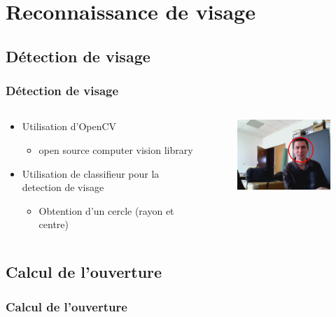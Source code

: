 \section{Reconnaissance de visage}
\subsection{Détection de visage}
\begin{frame}
  \frametitle{Détection de visage}
  \begin{columns}[c]
    \begin{column}[T]{.5\textwidth}
      \begin{itemize}
        \item Utilisation d'OpenCV
          \begin{itemize}
            \item open source computer vision library
          \end{itemize}
        \item Utilisation de classifieur pour la detection de visage
          \begin{itemize}
            \item Obtention d'un cercle (rayon et centre)
          \end{itemize}
      \end{itemize}
    \end{column}
    \begin{column}[T]{.5\textwidth}
      \begin{figure}
        \begin{center}
          \includegraphics[width=5cm]{image/faceDetection.png}
        \end{center}
      \end{figure}
    \end{column}
  \end{columns}   
\end{frame}

\subsection{Calcul de l'ouverture}
\begin{frame}
  \frametitle{Calcul de l'ouverture}
  \begin{figure}
    \begin{columns}[c]
      \begin{column}[T]{.5\textwidth}
        
      \end{column}
      \begin{column}[T]{.5\textwidth}
        
      \end{column}
    \end{columns}   
  \end{figure}
\end{frame}

